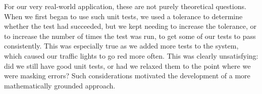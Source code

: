 For our very real-world application, these are not purely theoretical
questions.  When we first began to use such unit tests, we used a tolerance
to determine whether the test had succeeded, but we kept needing to
increase the tolerance, or to increase the number of times the test was
run, to get some of our tests to pass consistently.  This was especially
true as we added more tests to the system, which caused our traffic lights
to go red more often. This was clearly unsatisfying: did we still have
good unit tests, or had we relaxed them to the point where we were masking
errors?  Such considerations motivated the development of a more
mathematically grounded approach.


